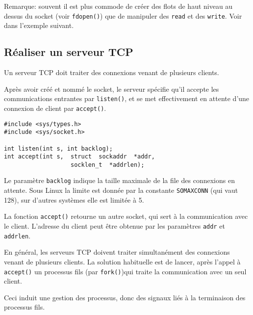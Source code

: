  
\source



Remarque: souvent il est plus commode de créer des flots de haut
niveau au dessus du socket (voir \texttt{fdopen()}) que de manipuler
des \texttt{read} et des \texttt{write}. Voir dans l'exemple suivant.

\subsection{Réaliser un serveur TCP}

Un serveur TCP doit traiter des connexions venant de plusieurs clients.


Après avoir créé et nommé le socket,  
le serveur spécifie qu'il
accepte les communications entrantes par \texttt{listen()}, et se met 
effectivement en attente
d'une connexion de client par \texttt{accept()}.


\extrait
\begin{lstlisting}
#include <sys/types.h>
#include <sys/socket.h> 

int listen(int s, int backlog);
int accept(int s,  struct  sockaddr  *addr,  
                   socklen_t  *addrlen);
\end{lstlisting}


Le paramètre \texttt{backlog} indique la taille maximale de la file des
 connexions en attente. Sous Linux la limite est donnée par
la constante \texttt{SOMAXCONN} (qui vaut 128), sur d'autres systèmes elle
est limitée à 5.


La fonction \texttt{accept()} retourne un autre socket, qui sert
à la communication avec le client.
L'adresse du client peut être obtenue par les paramètres
\texttt{addr} et \texttt{addrlen}.



En général, les serveurs TCP doivent traiter simultanément des
connexions venant de plusieurs clients. La solution habituelle est de
lancer, après l'appel à \texttt{accept()} un processus fils (par
\texttt{fork()})qui traite la communication avec un seul client.

Ceci
induit une gestion des processus, donc des signaux liés à la
terminaison des processus fils.


